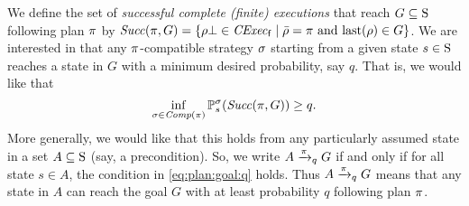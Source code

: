       
  


We define the set of \emph{successful complete (finite) executions}
that reach $G\subseteq\S$ following plan $\plan$ by
$\Succ(\plan,G)=\{{\rho\complete\in\cexecf}\mid{\bar{\rho}=\plan
  \text{ and } \last(\rho)\in G}\}$.
%
We are interested in that any $\plan$-compatible strategy $\strat$
starting from a given state $s\in\S$ reaches a state in $G$ with a
minimum desired probability, say $q$.  That is, we would like that
%
\begin{equation}\label{eq:plan:goal:q}
  \inf_{\strat \in\Comp(\plan)}\Prob^\strat_s(\Succ(\plan,G)) \geq q.
\end{equation}
%
More generally, we would like that this holds from any particularly
assumed state in a set $A\subseteq\S$ (say, a precondition).  So, we
write $A \reach{\plan}_q G$ if and only if for all state $s\in A$,
the condition in \cref{eq:plan:goal:q} holds.
%
Thus $A \reach{\plan}_q G$ means that any state in $A$ can reach the
goal $G$ with at least probability $q$ following plan $\plan$.

